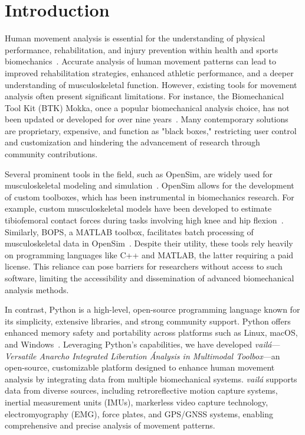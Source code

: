 \documentclass{article}
\begin{document}
\section{Introduction}

Human movement analysis is essential for the understanding of physical performance, rehabilitation, and injury prevention within health and sports biomechanics~\citep{ricamato2005quantification, roberts2017, cesar2016frontal, bedo2021influence, cesar2022muscle}. Accurate analysis of human movement patterns can lead to improved rehabilitation strategies, enhanced athletic performance, and a deeper understanding of musculoskeletal function. However, existing tools for movement analysis often present significant limitations. For instance, the Biomechanical Tool Kit (BTK) Mokka, once a popular biomechanical analysis choice, has not been updated or developed for over nine years~\citep{Barre2014}. Many contemporary solutions are proprietary, expensive, and function as "black boxes," restricting user control and customization and hindering the advancement of research through community contributions.

Several prominent tools in the field, such as OpenSim, are widely used for musculoskeletal modeling and simulation~\citep{seth2018opensim}. OpenSim allows for the development of custom toolboxes, which has been instrumental in biomechanics research. For example, custom musculoskeletal models have been developed to estimate tibiofemoral contact forces during tasks involving high knee and hip flexion~\citep{bedo2020custom}. Similarly, BOPS, a MATLAB toolbox, facilitates batch processing of musculoskeletal data in OpenSim~\citep{bedo2020474}. Despite their utility, these tools rely heavily on programming languages like C++ and MATLAB, the latter requiring a paid license. This reliance can pose barriers for researchers without access to such software, limiting the accessibility and dissemination of advanced biomechanical analysis methods.

In contrast, Python is a high-level, open-source programming language known for its simplicity, extensive libraries, and strong community support. Python offers enhanced memory safety and portability across platforms such as Linux, macOS, and Windows~\citep{python311}. Leveraging Python's capabilities, we have developed \textit{vailá}—\textit{Versatile Anarcho Integrated Liberation Ánalysis in Multimodal Toolbox}—an open-source, customizable platform designed to enhance human movement analysis by integrating data from multiple biomechanical systems. \textit{vailá} supports data from diverse sources, including retroreflective motion capture systems, inertial measurement units (IMUs), markerless video capture technology, electromyography (EMG), force plates, and GPS/GNSS systems, enabling comprehensive and precise analysis of movement patterns.
\end{document}
